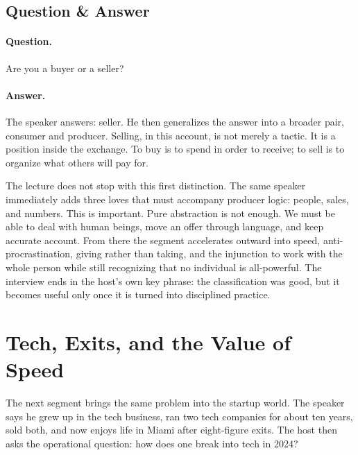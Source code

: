 \subsection{Question \& Answer}

\paragraph{Question.} Are you a buyer or a seller?

\paragraph{Answer.} The speaker answers: seller. He then generalizes the answer into a broader pair, consumer and producer. Selling, in this account, is not merely a tactic. It is a position inside the exchange. To buy is to spend in order to receive; to sell is to organize what others will pay for.

\begin{figure}[h]
\centering
{}
\end{figure}

The lecture does not stop with this first distinction. The same speaker immediately adds three loves that must accompany producer logic: people, sales, and numbers. This is important. Pure abstraction is not enough. We must be able to deal with human beings, move an offer through language, and keep accurate account. From there the segment accelerates outward into speed, anti-procrastination, giving rather than taking, and the injunction to work with the whole person while still recognizing that no individual is all-powerful. The interview ends in the host's own key phrase: the classification was good, but it becomes useful only once it is turned into disciplined practice.

\section{Tech, Exits, and the Value of Speed}

The next segment brings the same problem into the startup world. The speaker says he grew up in the tech business, ran two tech companies for about ten years, sold both, and now enjoys life in Miami after eight-figure exits. The host then asks the operational question: how does one break into tech in 2024?


